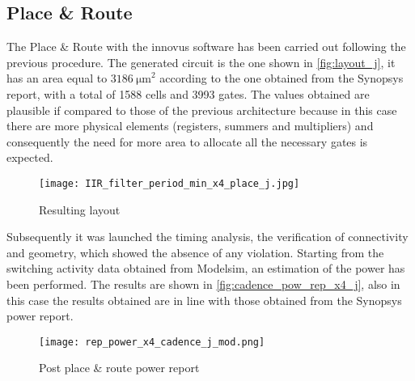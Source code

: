 \subsection{Place \& Route}
The Place \& Route with the innovus software has been carried out following the previous procedure. The generated circuit is the one shown in \autoref{fig:layout_j}, it has an area equal to $\SI{3186}{\micro\meter}^2$ according to the one obtained from the Synopsys report, with a total of 1588 cells and 3993 gates. The values obtained are plausible if compared to those of the previous architecture because in this case there are more physical elements (registers, summers and multipliers) and consequently the need for more area to allocate all the necessary gates is expected.

\begin{figure}[h]
	\center
	\texttt{[image: IIR\_filter\_period\_min\_x4\_place\_j.jpg]}
	\caption{Resulting layout}
	\label{fig:layout_j}
\end{figure}

Subsequently it was launched the timing analysis, the verification of connectivity and geometry, which showed the absence of any violation. Starting from the switching activity data obtained from Modelsim, an estimation of the power has been performed. The results are shown in \autoref{fig:cadence_pow_rep_x4_j}, also in this case the results obtained are in line with those obtained from the Synopsys power report.

\begin{figure}[ht]
	\center
	\texttt{[image: rep\_power\_x4\_cadence\_j\_mod.png]}
	\caption{Post place \& route power report}
	\label{fig:cadence_pow_rep_x4_j}
\end{figure}
